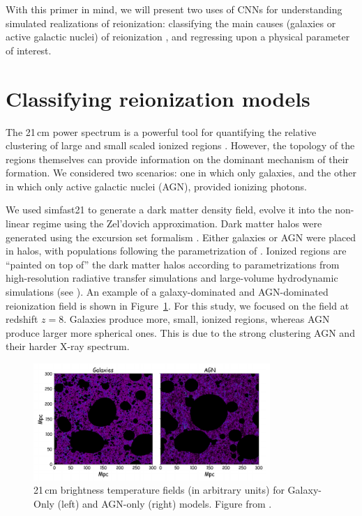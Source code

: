 With this primer in mind, we will present two uses of CNNs for understanding simulated realizations of reionization: classifying the main causes (galaxies or active galactic nuclei) of reionization \citep{Hassan.18}, and regressing upon a physical parameter of interest.

\section{Classifying reionization models}

The 21\,cm power spectrum is a powerful tool for quantifying the relative clustering of large and small scaled ionized regions \citep{Hassan.17}. However, the topology of the regions themselves can provide information on the dominant mechanism of their formation. We considered two scenarios: one in which only galaxies, and the other in which only active galactic nuclei (AGN), provided ionizing photons. 

We used {\sc simfast21} \citep{Santos.10, Hassan.17.1} to generate a dark matter density field, evolve it into the non-linear regime using the Zel'dovich approximation. Dark matter halos were generated using the excursion set formalism \citep{Bond.91}. Either galaxies or AGN were placed in halos, with populations following the parametrization of \cite{Hassan.16}. Ionized regions are ``painted on top of'' the dark matter halos according to parametrizations from high-resolution radiative transfer simulations and large-volume hydrodynamic simulations (see \cite{Hassan.16, Hassan.18}). An example of a galaxy-dominated and AGN-dominated reionization field is shown in Figure~\ref{fig:hassan-fields}. For this study, we focused on the field at redshift $z=8$. Galaxies produce more, small, ionized regions, whereas AGN produce larger more spherical ones. This is due to the strong clustering AGN and their harder X-ray spectrum.

\begin{figure}
\centering
\includegraphics[width=0.8\textwidth]{chapters/hera_ml/figures/hassan-field.png}
\caption[21\,cm brightness temperature fields for Galaxy-Only and AGN-only models.]{21\,cm brightness temperature fields (in arbitrary units) for Galaxy-Only (left) and AGN-only (right) models. Figure from \cite{Hassan.18}.}
\label{fig:hassan-fields}
\end{figure}

